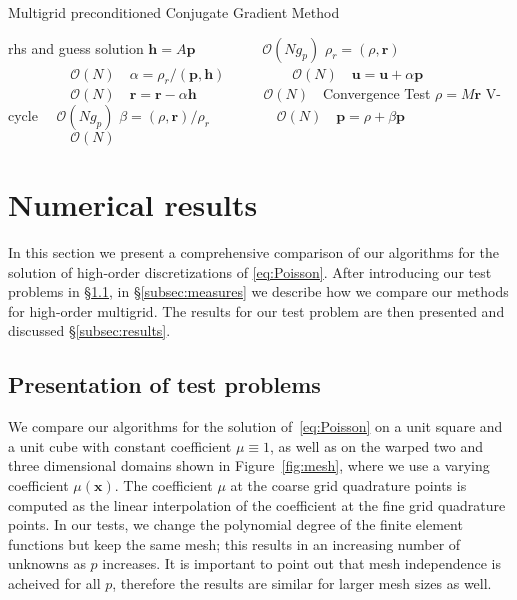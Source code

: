 \documentclass[smallcondensed,final]{svjour3}     %
\newcommand{\todo}[1]{\textcolor{red}{ #1}}
\newcommand{\bs}[1]{\ensuremath{\boldsymbol #1}}
\begin{document}
\begin{algorithm}[ht] 
  \caption{Multigrid preconditioned Conjugate Gradient Method} \label{alg:pcg} 
  \begin{algorithmic}[1]
    \Require rhs and guess
    \Ensure  solution
    \State $\bs{h} = A \bs{p}$ 											\Comment $~~\quad\quad\quad\quad\mathcal{O}(Ng_p)$
    \State $\rho_r = (\rho, \bs{r})$								\Comment $~~\quad\quad\quad\quad\mathcal{O}(N)~~~$
    \State $\alpha = \rho_r / ( \bs{p}, \bs{h} )$		\Comment $~~\quad\quad\quad\quad\mathcal{O}(N)~~~$
    \State $\bs{u} = \bs{u} + \alpha\bs{p}$					\Comment $~~\quad\quad\quad\quad\mathcal{O}(N)~~~$
    \State $\bs{r} = \bs{r} - \alpha\bs{h}$					\Comment $~~\quad\quad\quad\quad\mathcal{O}(N)~~~$
    \State Convergence Test
    \State $\rho = M\bs{r}$ 												\Comment V-cycle $\quad\mathcal{O}(Ng_p)$
    \State $\beta = (\rho, \bs{r}) / \rho_r$				\Comment $~~\quad\quad\quad\quad\mathcal{O}(N)~~~$
    \State $\bs{p} = \rho + \beta\bs{p}$						\Comment $~~\quad\quad\quad\quad\mathcal{O}(N)~~~$
    \EndWhile
  \end{algorithmic}
\end{algorithm}




\section{Numerical results}\label{sec:numerics}
In this section we present a comprehensive comparison of our
algorithms for the solution of high-order discretizations of
\eqref{eq:Poisson}.  After introducing our test problems in
\S\ref{subsec:tests}, in \S\ref{subsec:measures} we
describe how we compare our methods for high-order multigrid. The
results for our test problem are then presented and discussed
\S\ref{subsec:results}.


\subsection{Presentation of test problems}\label{subsec:tests}
We compare our algorithms for the solution of~\eqref{eq:Poisson} on a
unit square and a unit cube with constant coefficient $\mu\equiv 1$,
as well as on the warped two and three dimensional domains shown in
Figure~\ref{fig:mesh}, where we use a varying coefficient $\mu(\bs
x)$. 
The coefficient $\mu$ at the coarse grid quadrature points is
computed as the linear interpolation of the coefficient at the fine
grid quadrature points. In our tests, we change the polynomial degree of
the finite element functions but keep the same mesh; this results in
an increasing number of unknowns as $p$ increases. It is important to 
point out that mesh independence is acheived for all $p$, therefore
the results are similar for larger mesh sizes as well.
\end{document}
